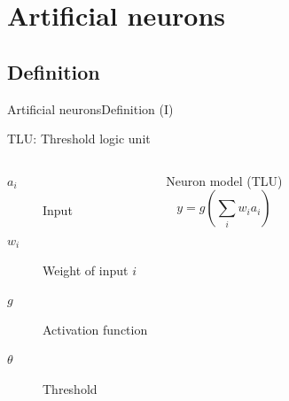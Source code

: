\documentclass[10pt,compress]{beamer} %
\begin{document}
\section{Artificial neurons}

\subsection{Definition}

\begin{frame}{Artificial neurons}{Definition (I)}

    TLU: Threshold logic unit\\

    

	\medskip

    \begin{columns}
		\begin{description}
		\item[$a_i$] Input
		\item[$w_{i}$] Weight of input $i$
		\item[$g$] Activation function
		\item[$\theta$] Threshold
		\end{description}

	    \begin{block}{Neuron model (TLU)}
	   \vspace{-0.5cm}
	   \begin{equation*}
	   y=g\left( \sum_{i} w_{i} a_i \right)
	   \end{equation*}
	   \end{block}

    \end{columns}
\end{frame}
\end{document}
